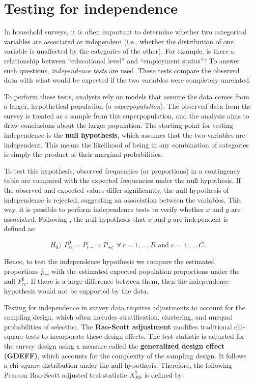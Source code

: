 \documentclass[
  12pt,
]{book}
\begin{document}
\hypertarget{testing-for-independence}{%
\section{Testing for independence}\label{testing-for-independence}}

In household surveys, it is often important to determine whether two categorical variables are associated or independent (i.e., whether the distribution of one variable is unaffected by the categories of the other). For example, is there a relationship between ``educational level'' and ``employment status''? To answer such questions, \emph{independence tests} are used. These tests compare the observed data with what would be expected if the two variables were completely unrelated.

To perform these tests, analysts rely on models that assume the data comes from a larger, hypothetical population (a \emph{superpopulation}). The observed data from the survey is treated as a sample from this superpopulation, and the analysis aims to draw conclusions about the larger population. The starting point for testing independence is the \textbf{null hypothesis}, which assumes that the two variables are independent. This means the likelihood of being in any combination of categories is simply the product of their marginal probabilities.

To test this hypothesis, observed frequencies (or proportions) in a contingency table are compared with the expected frequencies under the null hypothesis. If the observed and expected values differ significantly, the null hypothesis of independence is rejected, suggesting an association between the variables. This way, it is possible to perform independence tests to verify whether \(x\) and \(y\) are associated. Following \citet{Heeringa2017}, the null hypothesis that \(x\) and \(y\) are independent is defined as:

\[
H_0) \ \ P_{rc}^0 = {P_{r+} \times P_{+c}} \ \ \forall \ r=1, \ldots, R \text{ and } c=1, \ldots, C.
\]

Hence, to test the independence hypothesis we compare the estimated proportions \(\widehat{p}_{rc}\) with the estimated expected population proportions under the null \(P_{rc}^0\). If there is a large difference between them, then the independence hypothesis would not be supported by the data.

Testing for independence in survey data requires adjustments to account for the sampling design, which often includes stratification, clustering, and unequal probabilities of selection. The \textbf{Rao-Scott adjustment} modifies traditional chi-square tests to incorporate these design effects. The test statistic is adjusted for the survey design using a measure called the \textbf{generalized design effect (GDEFF)}, which accounts for the complexity of the sampling design. It follows a chi-square distribution under the null hypothesis. Therefore, the following Pearson Rao-Scott adjusted test statistic \(X_{RS}^2\) \citep{Rao1984} is defined by:
\end{document}
